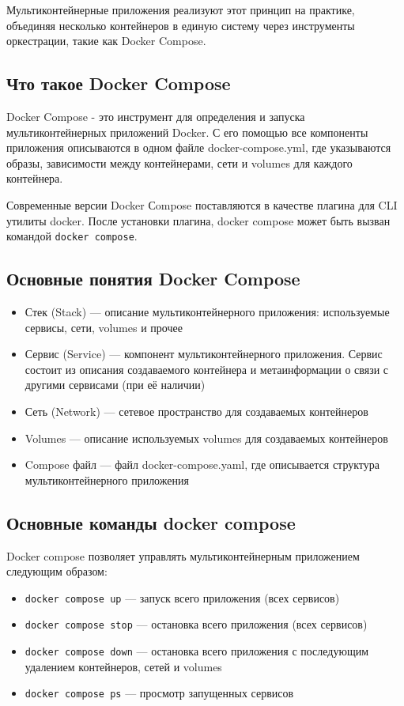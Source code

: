 \documentclass[12pt,a4paper]{article}
\begin{document}
Мультиконтейнерные приложения реализуют этот принцип на практике,
объединяя несколько контейнеров в единую систему через инструменты оркестрации, такие как Docker Compose.

\subsection{Что такое Docker Compose}

Docker Compose - это инструмент для определения и запуска мультиконтейнерных приложений Docker. С его помощью все компоненты
приложения описываются в одном файле docker-compose.yml, где указываются образы, зависимости между контейнерами, сети
и volumes для каждого контейнера.

Современные версии Docker Сompose поставляются в качестве плагина для CLI утилиты docker.
После установки плагина, docker compose может быть вызван командой \lstinline|docker compose|.

\subsection{Основные понятия Docker Compose}

\begin{itemize}
    \item Стек (Stack) — описание мультиконтейнерного приложения: используемые сервисы, сети, volumes и прочее
    \item Сервис (Service) — компонент мультиконтейнерного приложения. Сервис состоит из описания создаваемого контейнера и метаинформации о связи с другими сервисами (при её наличии)
    \item Сеть (Network) — сетевое пространство для создаваемых контейнеров
    \item Volumes — описание используемых volumes для создаваемых контейнеров
    \item Compose файл — файл docker-compose.yaml, где описывается структура мультиконтейнерного приложения
\end{itemize}

\subsection{Основные команды docker compose}

Docker compose позволяет управлять мультиконтейнерным приложением следующим образом:

\begin{itemize}
    \item \texttt{docker compose up} — запуск всего приложения (всех сервисов)
    \item \texttt{docker compose stop} — остановка всего приложения (всех сервисов)
    \item \texttt{docker compose down} — остановка всего приложения с последующим удалением контейнеров, сетей и volumes
    \item \texttt{docker compose ps} — просмотр запущенных сервисов
\end{itemize}
\end{document}
